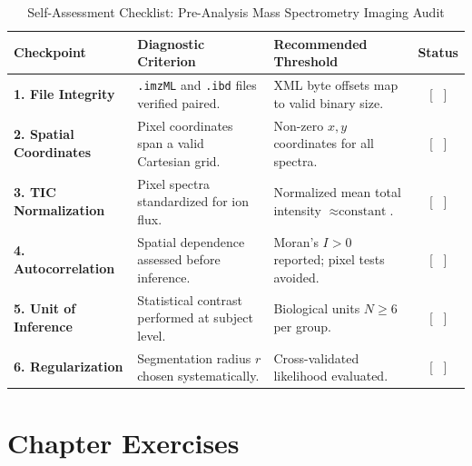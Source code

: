 \documentclass[11pt,twoside,openright]{book}
\begin{document}
\begin{table}[ht]
\centering
\caption{Self-Assessment Checklist: Pre-Analysis Mass Spectrometry Imaging Audit}
\label{tab:checklist_msi}
\small
\begin{tabularx}{\textwidth}{l p{5.5cm} X c}
\toprule
\textbf{Checkpoint} & \textbf{Diagnostic Criterion} & \textbf{Recommended Threshold} & \textbf{Status} \\
\midrule
\textbf{1. File Integrity} & \texttt{.imzML} and \texttt{.ibd} files verified paired. & XML byte offsets map to valid binary size. & [ \ ] \\
\addlinespace
\textbf{2. Spatial Coordinates} & Pixel coordinates span a valid Cartesian grid. & Non-zero $x, y$ coordinates for all spectra. & [ \ ] \\
\addlinespace
\textbf{3. TIC Normalization} & Pixel spectra standardized for ion flux. & Normalized mean total intensity $\approx \text{constant}$. & [ \ ] \\
\addlinespace
\textbf{4. Autocorrelation} & Spatial dependence assessed before inference. & Moran's $I > 0$ reported; pixel tests avoided. & [ \ ] \\
\addlinespace
\textbf{5. Unit of Inference} & Statistical contrast performed at subject level. & Biological units $N \ge 6$ per group. & [ \ ] \\
\addlinespace
\textbf{6. Regularization} & Segmentation radius $r$ chosen systematically. & Cross-validated likelihood evaluated. & [ \ ] \\
\bottomrule
\end{tabularx}
\end{table}

\FloatBarrier

\section{Chapter Exercises}
\end{document}
